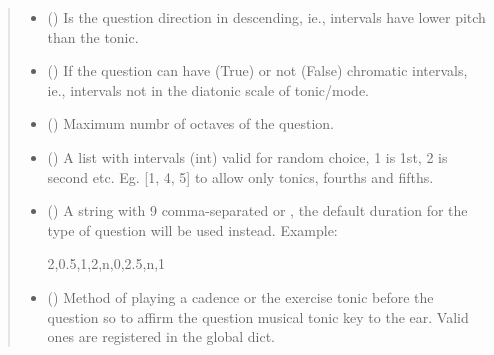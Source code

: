 \documentclass[letterpaper,10pt,english]{sphinxmanual}
\begin{document}
\begin{fulllineitems}
\begin{fulllineitems}
\begin{quote}
\begin{description}
\begin{itemize}
\item {} 
 () \textendash{} Is the question direction in descending,
ie., intervals have lower pitch than the tonic.

\item {} 
 () \textendash{} If the question can have (True) or not
(False) chromatic intervals, ie., intervals not in the
diatonic scale of tonic/mode.

\item {} 
 () \textendash{} Maximum numbr of octaves of the question.

\item {} 
 () \textendash{} A list with intervals (int) valid for
random choice, 1 is 1st, 2 is second etc. Eg. {[}1, 4, 5{]} to
allow only tonics, fourths and fifths.

\item {} 
 () \textendash{} 
A string with 9 comma-separated  or
, the
default duration for the type of question will be used instead.
Example:

%
\begin{sphinxVerbatim}[commandchars=\\\{\}]
\PYGZdq{}2,0.5,1,2,n,0,2.5,n,1\PYGZdq{}
\end{sphinxVerbatim}


\item {} 
 () \textendash{} Method of playing a cadence or the
exercise tonic before the question so to affirm the question
musical tonic key to the ear. Valid ones are registered in the
 global dict.


\end{itemize}
\end{description}
\end{quote}
\end{fulllineitems}
\end{fulllineitems}
\end{document}
